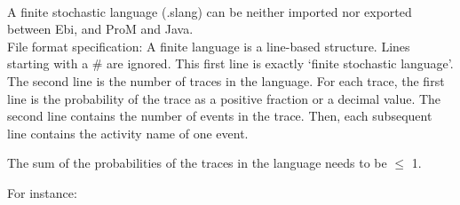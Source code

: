 {\\A finite stochastic language (.slang) can be neither imported nor exported between Ebi, and ProM and Java.
\\File format specification:
A finite language is a line-based structure. Lines starting with a \# are ignored.
    This first line is exactly `finite stochastic language'.
    The second line is the number of traces in the language.
    For each trace, the first line is the probability of the trace as a positive fraction or a decimal value.
    The second line contains the number of events in the trace.
    Then, each subsequent line contains the activity name of one event.

    The sum of the probabilities of the traces in the language needs to be $\leq$ 1.
    
    For instance:
    
\clearpage
}
